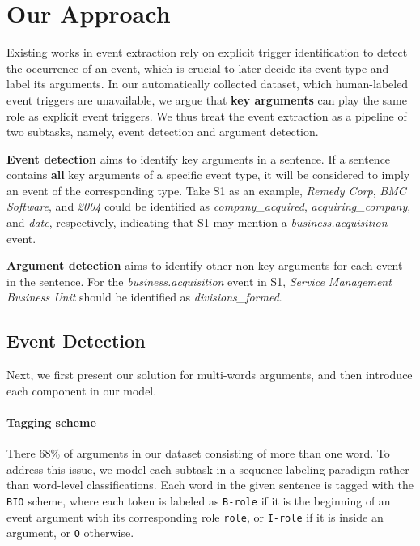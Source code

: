 \section{Our Approach}
Existing works in event extraction rely on explicit trigger identification to detect the occurrence of an event, 
which is crucial to later decide its event type and label its arguments.
In our automatically collected dataset, which human-labeled event triggers are unavailable, we argue that 
\textbf{key arguments} can play the same role as explicit event triggers. We thus treat the event extraction as a pipeline of two subtasks, namely, event detection and argument detection. 

\textbf{Event detection} aims to identify key arguments in a sentence. If a sentence contains \textbf{all} key arguments of a specific event type, it will be considered to imply an event of the corresponding type. Take S1 as an example, \emph{Remedy Corp}, \emph{BMC Software}, and \emph{2004} could be identified as \emph{company\_acquired}, \emph{acquiring\_company}, and \emph{date}, respectively,  indicating that  S1 may  mention  a  \emph{business.acquisition} event.  

\textbf{Argument detection} aims to identify other non-key arguments for each event in the sentence. For the \emph{business.acquisition} event in S1, \emph{Service Management Business Unit} should be identified as \emph{divisions\_formed}.

\subsection{Event Detection \label{evede}}
Next, we first present our solution for multi-words arguments, and then introduce each component in our model.

\vspace{-.8em}
\paragraph{Tagging scheme}
There 68\%  of  arguments in our dataset consisting of more than one word. To address this issue, we model each subtask in a sequence labeling paradigm rather than word-level classifications. Each word in the given sentence is tagged with the \texttt{BIO} scheme, where each token is labeled as \texttt{B-role} if it is the beginning of an event argument with its corresponding role \texttt{role}, or \texttt{I-role} if it is inside an argument, or \texttt{O} otherwise. 

